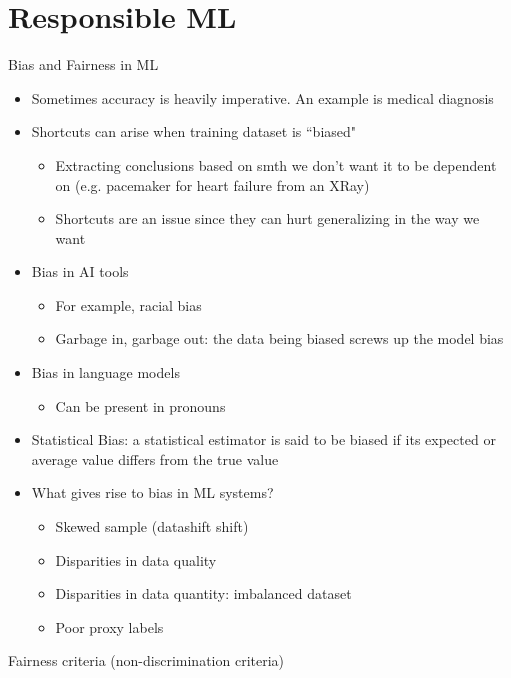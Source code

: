 \documentclass[10pt, oneside]{article}
\begin{document}
\section{Responsible ML}
Bias and Fairness in ML
\begin{itemize}
    \item Sometimes accuracy is heavily imperative. An example is medical diagnosis
    \item Shortcuts can arise when training dataset is ``biased"
    \begin{itemize}
        \item Extracting conclusions based on smth we don't want it to be dependent on (e.g. pacemaker for heart failure from an XRay)
        \item Shortcuts are an issue since they can hurt generalizing in the way we want
    \end{itemize}
    \item Bias in AI tools
    \begin{itemize}
        \item For example, racial bias
        \item Garbage in, garbage out: the data being biased screws up the model bias
    \end{itemize}
    \item Bias in language models
    \begin{itemize}
        \item Can be present in pronouns
    \end{itemize}
    \item Statistical Bias: a statistical estimator is said to be biased if its expected or average value differs from the true value
    \item What gives rise to bias in ML systems?
    \begin{itemize}
        \item Skewed sample (datashift shift)
        \item Disparities in data quality
        \item Disparities in data quantity: imbalanced dataset
        \item Poor proxy labels
    \end{itemize}
\end{itemize}
Fairness criteria (non-discrimination criteria)
\end{document}
